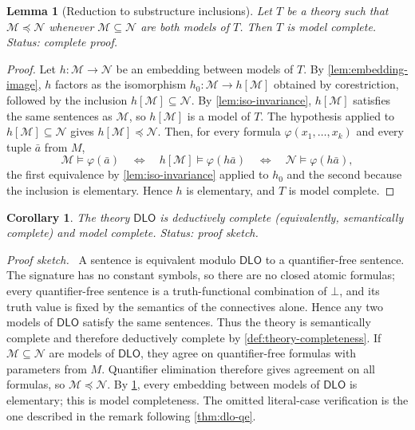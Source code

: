 \documentclass[11pt,oneside,openany]{book}
\theoremstyle{definition}
\theoremstyle{plain}
\newtheorem{lemma}[definition]{Lemma}
\newtheorem{corollary}[definition]{Corollary}
\theoremstyle{remark}
\newenvironment{proofplan}{\par\noindent\textit{Proof sketch.}\ }{\par}
\newcommand{\entails}{\models}
\newcommand{\bottom}{\bot}
\begin{document}
\begin{lemma}[Reduction to substructure inclusions]
\label{lem:model-completeness-reduction}
Let \(T\) be a theory such that
\(\mathcal M\preccurlyeq\mathcal N\) whenever
\(\mathcal M\subseteq\mathcal N\) are both models of \(T\).  Then \(T\)
is model complete.
\textit{Status: complete proof.}
\end{lemma}
\begin{proof}
Let \(h:\mathcal M\to\mathcal N\) be an embedding between models of
\(T\).  By \cref{lem:embedding-image}, \(h\) factors as the isomorphism
\(h_0:\mathcal M\to h[\mathcal M]\) obtained by corestriction, followed
by the inclusion \(h[\mathcal M]\subseteq\mathcal N\).  By
\cref{lem:iso-invariance}, \(h[\mathcal M]\) satisfies the same sentences
as \(\mathcal M\), so \(h[\mathcal M]\) is a model of \(T\).  The
hypothesis applied to \(h[\mathcal M]\subseteq\mathcal N\) gives
\(h[\mathcal M]\preccurlyeq\mathcal N\).  Then, for every formula
\(\varphi(x_1,\ldots,x_k)\) and every tuple \(\bar a\) from \(M\),
\[
  \mathcal M\entails\varphi(\bar a)
  \quad\Longleftrightarrow\quad
  h[\mathcal M]\entails\varphi(h\bar a)
  \quad\Longleftrightarrow\quad
  \mathcal N\entails\varphi(h\bar a),
\]
the first equivalence by \cref{lem:iso-invariance} applied to \(h_0\) and
the second because the inclusion is elementary.  Hence \(h\) is
elementary, and \(T\) is model complete.
\end{proof}

\begin{corollary}
The theory \(\mathsf{DLO}\) is deductively complete (equivalently,
semantically complete) and model complete.
\textit{Status: proof sketch.}
\end{corollary}

\begin{proofplan}
A sentence is equivalent modulo \(\mathsf{DLO}\) to a quantifier-free sentence.
The signature has no constant symbols, so there are no closed atomic
formulas; every quantifier-free sentence is a truth-functional combination
of \(\bottom\), and its truth value is fixed by the semantics of the
connectives alone.  Hence any two models of
\(\mathsf{DLO}\) satisfy the same sentences.  Thus the theory is semantically
complete and therefore deductively complete by
\cref{def:theory-completeness}.
If \(\mathcal M\subseteq\mathcal N\) are models of \(\mathsf{DLO}\), they agree
on quantifier-free formulas with parameters from \(M\).  Quantifier elimination
therefore gives agreement on all formulas, so
\(\mathcal M\preccurlyeq\mathcal N\).  By
\cref{lem:model-completeness-reduction}, every embedding between models
of \(\mathsf{DLO}\) is elementary; this is model completeness.
The omitted literal-case verification is the one described in the remark
following \cref{thm:dlo-qe}.
\end{proofplan}
\end{document}
